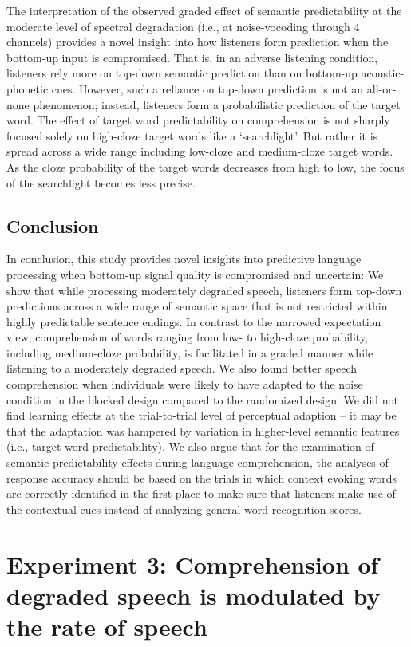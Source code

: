 \documentclass[a4paper, nobind]{templates/ociamthesis}
\begin{document}
The interpretation of the observed graded effect of semantic predictability at the moderate level of spectral degradation (i.e., at noise-vocoding through 4 channels) provides a novel insight into how listeners form prediction when the bottom-up input is compromised.
That is, in an adverse listening condition, listeners rely more on top-down semantic prediction than on bottom-up acoustic-phonetic cues.
However, such a reliance on top-down prediction is not an all-or-none phenomenon; instead, listeners form a probabilistic prediction of the target word.
The effect of target word predictability on comprehension is not sharply focused solely on high-cloze target words like a `searchlight'.
But rather it is spread across a wide range including low-cloze and medium-cloze target words. As the cloze probability of the target words decreases from high to low, the focus of the searchlight becomes less precise.

\hypertarget{conclusion}{%
\section{Conclusion}\label{conclusion}}

In conclusion, this study provides novel insights into predictive language processing when bottom-up signal quality is compromised and uncertain:
We show that while processing moderately degraded speech, listeners form top-down predictions across a wide range of semantic space that is not restricted within highly predictable sentence endings.
In contrast to the narrowed expectation view, comprehension of words ranging from low- to high-cloze probability, including medium-cloze probability, is facilitated in a graded manner while listening to a moderately degraded speech.
We also found better speech comprehension when individuals were likely to have adapted to the noise condition in the blocked design compared to the randomized design.
We did not find learning effects at the trial-to-trial level of perceptual adaption -- it may be that the adaptation was hampered by variation in higher-level semantic features (i.e., target word predictability).
We also argue that for the examination of semantic predictability effects during language comprehension, the analyses of response accuracy should be based on the trials in which context evoking words are correctly identified in the first place to make sure that listeners make use of the contextual cues instead of analyzing general word recognition scores.

\hypertarget{experiment-3-comprehension-of-degraded-speech-is-modulated-by-the-rate-of-speech}{%
\chapter{Experiment 3: Comprehension of degraded speech is modulated by the rate of speech}\label{experiment-3-comprehension-of-degraded-speech-is-modulated-by-the-rate-of-speech}}
\end{document}
